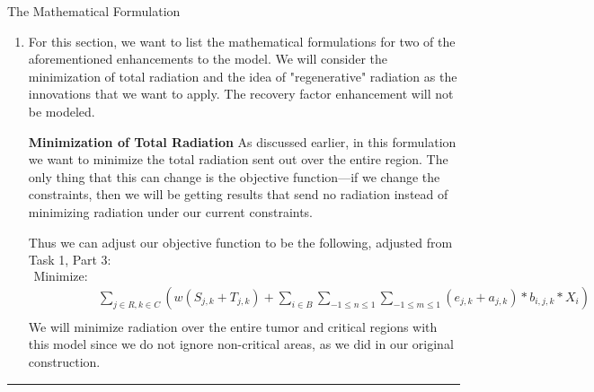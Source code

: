 \documentclass[12pt]{article}
\makeatletter
\newenvironment{task}{\@startsection
       {section}{1}
       {0.4em}{-.5ex plus -1ex minus -.2ex}{.5ex plus .2ex}
       {\pagebreak[3]\large\bf\noindent{Task}}}
       {\nopagebreak[3]\vspace{3ex}\begin{center}\rule{1\linewidth}{.3pt}\end{center}}
\makeatother
\begin{document}
\begin{task}{The Mathematical Formulation}
\begin{enumerate}
Our objective function would only change to minimize the radiation that hits the critical area over multiple time periods, with an adjustment factor to weigh the radiation in different time periods differently. Our constraints would have to change to sum over multiple time periods, with the beam intensities varying over different time periods. The non-negativity constraints would thus change to apply over all these different time periods. 

\item For this section, we want to list the mathematical formulations for two of the aforementioned enhancements to the model. We will consider the minimization of total radiation and the idea of "regenerative" radiation as the innovations that we want to apply. The recovery factor enhancement will not be modeled.

\textbf{Minimization of Total Radiation} As discussed earlier, in this formulation we want to minimize the total radiation sent out over the entire region. The only thing that this can change is the objective function—if we change the constraints, then we will be getting results that send no radiation instead of minimizing radiation under our current constraints. 

Thus we can adjust our objective function to be the following, adjusted from Task 1, Part 3:
\begin{eqnarray*} 
\textrm{Minimize:} \\
& \sum_{j \in R, k \in C} (w(S_{j,k} + T_{j,k}) + \sum_{i \in B} \sum_{-1 \leq n \leq 1} \sum_{-1 \leq m \leq 1} (e_{j,k}+a_{j,k})  * b_{i,j,k} * X_{i})\\ 
\end{eqnarray*}
We will minimize radiation over the entire tumor and critical regions with this model since we do not ignore non-critical areas, as we did in our original construction. 


\end{enumerate}
\end{task}
\end{document}

